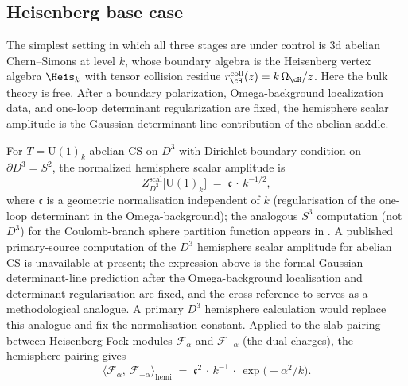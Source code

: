 \subsection{Heisenberg base case}
\label{subsec:heisenberg-base-case}

The simplest setting in which all three stages are under control
is $3$d abelian Chern--Simons at level $k$, whose boundary
algebra is the Heisenberg vertex algebra $\Heis_k$ with
tensor collision residue $r^{\mathrm{coll}}_{\cH}(z)=k\,\Omega_{\cH}/z$.
Here the bulk theory is free. After a boundary polarization,
Omega-background localization data, and one-loop determinant
regularization are fixed, the hemisphere scalar amplitude is the
Gaussian determinant-line contribution of the abelian saddle.

\begin{computation}
\label{comp:heisenberg-hemisphere-pairing}
For $T = \mathrm{U}(1)_k$ abelian CS on $D^3$ with Dirichlet
boundary condition on $\partial D^3 = S^2$, the normalized
hemisphere scalar amplitude is
\[
 Z_{D^3}^{\mathrm{scal}}\bigl[\mathrm{U}(1)_k\bigr]
 \;=\;
 \mathfrak c\,\cdot\, k^{-1/2},
\]
where $\mathfrak c$ is a geometric normalisation independent of
$k$ (regularisation of the one-loop determinant in the
Omega-background); the analogous $S^3$ computation
\textup{(}not $D^3$\textup{)} for the Coulomb-branch sphere
partition function appears in \cite{DFPY16}. A published primary-source
computation of the $D^3$ hemisphere scalar amplitude for abelian CS is
unavailable at present; the expression above is the formal Gaussian
determinant-line prediction after the Omega-background localisation and
determinant regularisation are fixed, and the cross-reference to
\cite{DFPY16} serves as a methodological analogue. A primary $D^3$
hemisphere calculation would replace this analogue and fix the
normalisation constant.
Applied to the slab pairing between Heisenberg Fock modules
$\mathcal F_\alpha$ and $\mathcal F_{-\alpha}$ (the dual
charges), the hemisphere pairing gives
\[
 \bigl\langle \mathcal F_\alpha,\, \mathcal F_{-\alpha}
 \bigr\rangle_{\mathrm{hemi}}
 \;=\;
 \mathfrak c^2\,\cdot\, k^{-1}\,\cdot\,
 \exp\!\bigl(-\alpha^2/k\bigr).
\]
\end{computation}

